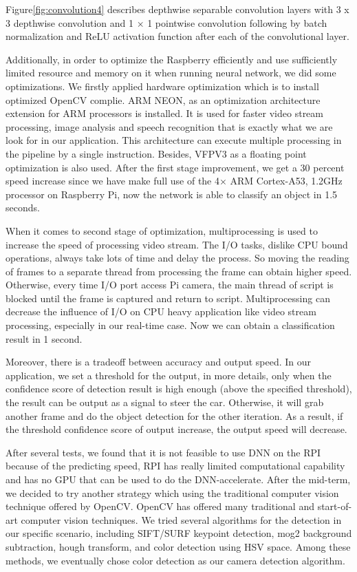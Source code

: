 \documentclass[11pt, titlepage]{article} %
\begin{document}
Figure\ref{fig:convolution4} describes depthwise separable convolution layers with 3 x 3 depthwise convolution and 1 × 1 pointwise convolution following by batch normalization and ReLU activation function after each of the convolutional layer. 

Additionally, in order to optimize the Raspberry efficiently and use sufficiently limited resource and memory on it when running neural network, we did some optimizations. We firstly applied hardware optimization which is to install optimized OpenCV complie. ARM NEON, as an optimization architecture extension for ARM processors is installed. It is used for faster video stream processing, image analysis and speech recognition that is exactly what we are look for in our application. This architecture can execute multiple processing in the pipeline by a single instruction. Besides, VFPV3 as a floating point optimization is also used. After the first stage improvement, we get a 30 percent speed increase since we have make full use of the 4× ARM Cortex-A53, 1.2GHz processor on Raspberry Pi, now the network is able to classify an object in 1.5 seconds. 

When it comes to second stage of optimization, multiprocessing is used to increase the speed of processing video stream. The I/O tasks, dislike CPU bound operations, always take lots of time and delay the process. So moving the reading of frames to a separate thread from processing the frame can obtain higher speed. Otherwise, every time I/O port access Pi camera, the main thread of script is blocked until the frame is captured and return to script. Multiprocessing can decrease the influence of I/O on CPU heavy application like video stream processing, especially in our real-time case. Now we can obtain a classification result in 1 second.

Moreover, there is a tradeoff between accuracy and output speed. In our application, we set a threshold for the output, in more details, only when the confidence score of detection result is high enough (above the specified threshold), the result can be output as a signal to steer the car. Otherwise, it will grab another frame and do the object detection for the other iteration. As a result, if the threshold confidence score of output increase, the output speed will decrease. 

After several tests, we found that it is not feasible to use DNN on the RPI because of the predicting speed, RPI has really limited computational capability and has no GPU that can be used to do the DNN-accelerate. After the mid-term, we decided to try another strategy which using the traditional computer vision technique offered by OpenCV. OpenCV has offered many traditional and start-of-art computer vision techniques. We tried several algorithms for the detection in our specific scenario, including SIFT/SURF keypoint detection, mog2 background subtraction, hough transform, and color detection using HSV space. Among these methods, we eventually chose color detection as our camera detection algorithm.
\end{document}
